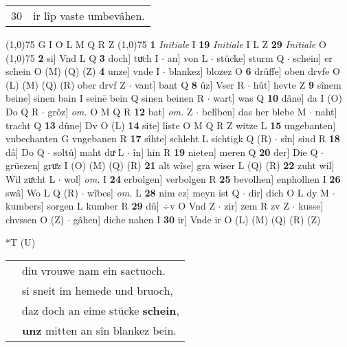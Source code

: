 \documentclass[8pt,a4paper,notitlepage]{article}
\begin{document}
\begin{table}[ht]
\begin{minipage}[t]{0.5\linewidth}
\begin{tabular}{rl}
30 & ir lîp vaste umbevâhen.\\ 
\end{tabular}
\scriptsize
\line(1,0){75} \newline
G I O L M Q R Z \newline
\line(1,0){75} \newline
\textbf{1} \textit{Initiale} I  \textbf{19} \textit{Initiale} I L Z  \textbf{29} \textit{Initiale} O  \newline
\line(1,0){75} \newline
\textbf{2} si] Vnd L Q \textbf{3} doch] tuͤch I  $\cdot$ an] von L  $\cdot$ stücke] sturm Q  $\cdot$ schein] er schein O (M) (Q) (Z) \textbf{4} unze] vnde I  $\cdot$ blankez] blozez O \textbf{6} drûffe] oben drvfe O (L) (M) (Q) (R) ober drvf Z  $\cdot$ vant] bant Q \textbf{8} ûz] Vser R  $\cdot$ hût] hevte Z \textbf{9} sînem beine] sinen bain I seinē bein Q sinen beinen R  $\cdot$ wart] was Q \textbf{10} dâne] da I (O) Do Q R  $\cdot$ grôz] \textit{om.} O M Q R \textbf{12} bat] \textit{om.} Z  $\cdot$ belîben] das her blebe M  $\cdot$ naht] tracht Q \textbf{13} dûne] Dv O (L) \textbf{14} site] liste O M Q R Z witze L \textbf{15} ungebanten] vnbechanten G vngebanen R \textbf{17} sîhte] schleht L sichtigk Q (R)  $\cdot$ sîn] sind R \textbf{18} dâ] Do Q  $\cdot$ soltû] maht duͯ L  $\cdot$ în] hin R \textbf{19} nieten] meren Q \textbf{20} der] Die Q  $\cdot$ grüezen] gruͤz I (O) (M) (Q) (R) \textbf{21} alt wîse] gra wiser L (Q) (R) \textbf{22} zuht wil] Wil zuͯcht L  $\cdot$ wol] \textit{om.} I \textbf{24} erbolgen] verbolgen R \textbf{25} bevolhen] enpholhen I \textbf{26} swâ] Wo L Q (R)  $\cdot$ wîbes] \textit{om.} L \textbf{28} nim ez] meyn ist Q  $\cdot$ dir] dich O L dy M  $\cdot$ kumbers] sorgen L kumber R \textbf{29} dû] ÷v O Vnd Z  $\cdot$ zir] zem R zv Z  $\cdot$ kusse] chvssen O (Z)  $\cdot$ gâhen] diche nahen I \textbf{30} ir] Vnde ir O (L) (M) (Q) (R) (Z) \newline
\end{minipage}
\hspace{0.5cm}
\begin{minipage}[t]{0.5\linewidth}
\small
\begin{center}*T (U)
\end{center}
\begin{tabular}{rl}
 & diu vrouwe nam ein sactuoch.\\ 
 & si sneit im hemede und bruoch,\\ 
 & daz doch an eime stücke \textbf{schein},\\ 
 & \textbf{unz} mitten an sîn blankez bein.\\ 

\end{tabular}
\end{minipage}
\end{table}
\end{document}

